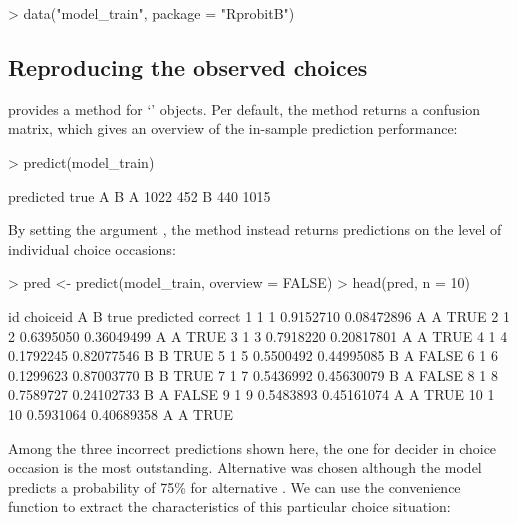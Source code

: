 \documentclass[article]{jss}
\newcommand{\class}[1]{`\code{#1}'}
\newcommand{\fct}[1]{\code{#1()}}
\begin{document}
\begin{Schunk}
\begin{Sinput}
> data("model_train", package = "RprobitB")
\end{Sinput}
\end{Schunk}


\subsection{Reproducing the observed choices} \label{subsec:reproducing_observed_choices}

 provides a \fct{predict} method for \class{RprobitB\_fit} objects. Per default, the method returns a confusion matrix, which gives an overview of the in-sample prediction performance:

\begin{Schunk}
\begin{Sinput}
> predict(model_train)
\end{Sinput}
\begin{Soutput}
    predicted
true    A    B
   A 1022  452
   B  440 1015
\end{Soutput}
\end{Schunk}

By setting the argument , the method instead returns predictions on the level of individual choice occasions:

\begin{Schunk}
\begin{Sinput}
> pred <- predict(model_train, overview = FALSE)
> head(pred, n = 10)
\end{Sinput}
\begin{Soutput}
   id choiceid         A          B true predicted correct
1   1        1 0.9152710 0.08472896    A         A    TRUE
2   1        2 0.6395050 0.36049499    A         A    TRUE
3   1        3 0.7918220 0.20817801    A         A    TRUE
4   1        4 0.1792245 0.82077546    B         B    TRUE
5   1        5 0.5500492 0.44995085    B         A   FALSE
6   1        6 0.1299623 0.87003770    B         B    TRUE
7   1        7 0.5436992 0.45630079    B         A   FALSE
8   1        8 0.7589727 0.24102733    B         A   FALSE
9   1        9 0.5483893 0.45161074    A         A    TRUE
10  1       10 0.5931064 0.40689358    A         A    TRUE
\end{Soutput}
\end{Schunk}

Among the three incorrect predictions shown here, the one for decider  in choice occasion  is the most outstanding. Alternative  was chosen although the model predicts a probability of 75\% for alternative . We can use the convenience function \fct{get\_cov} to extract the characteristics of this particular choice situation:
\end{document}
